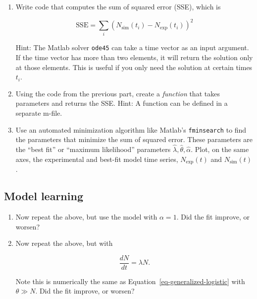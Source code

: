 \documentclass[
  letterpaper,
  DIV=11,
  numbers=noendperiod]{scrartcl}
\begin{document}
\begin{enumerate}
\def\labelenumi{\alph{enumi}.}
\setcounter{enumi}{3}
\item
  Write code that computes the sum of squared error (SSE), which is

  \[\mathrm{SSE} = \sum_i \left( N_\mathrm{sim}(t_i) - N_\mathrm{exp}(t_i)\right)^2\]

  Hint: The Matlab solver \texttt{ode45} can take a time vector as an
  input argument. If the time vector has more than two elements, it will
  return the solution only at those elements. This is useful if you only
  need the solution at certain times \(t_i\).
\item
  Using the code from the previous part, create a \emph{function} that
  takes parameters and returns the SSE. Hint: A function can be defined
  in a separate m-file.
\item
  Use an automated minimization algorithm like Matlab's
  \texttt{fminsearch} to find the parameters that minimize the sum of
  squared error. These parameters are the ``best fit'' or ``maximum
  likelihood'' parameters \(\hat\lambda,\hat\theta,\hat\alpha\). Plot,
  on the same axes, the experimental and best-fit model time series,
  \(N_\mathrm{exp}(t)\) and \(N_\mathrm{sim}(t)\).
\end{enumerate}

\subsection{Model learning}\label{model-learning}

\begin{enumerate}
\def\labelenumi{\alph{enumi}.}
\setcounter{enumi}{6}
\item
  Now repeat the above, but use the model with \(\alpha=1\). Did the fit
  improve, or worsen?
\item
  Now repeat the above, but with

  \[\frac{dN}{dt} = \lambda N.\]

  Note this is numerically the same as
  Equation~\ref{eq-generalized-logistic} with \(\theta \gg N\). Did the
  fit improve, or worsen?
\end{enumerate}
\end{document}
